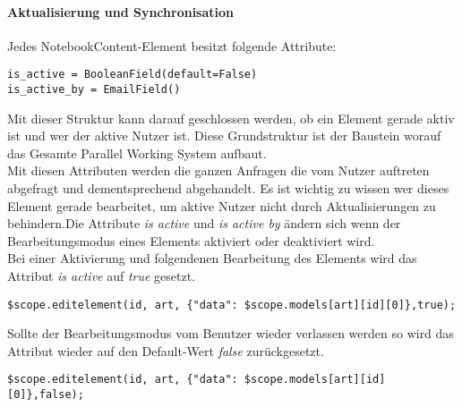 \paragraph{Aktualisierung und Synchronisation}
Jedes NotebookContent-Element besitzt folgende Attribute:
\begin{lstlisting}[caption={Parallel Working System Attribute}]
is_active = BooleanField(default=False)
is_active_by = EmailField()
\end{lstlisting}
Mit dieser Struktur kann darauf geschlossen werden, ob ein Element gerade aktiv ist und wer der aktive Nutzer ist. Diese Grundstruktur ist der Baustein worauf das Gesamte Parallel Working System aufbaut.\\
Mit diesen Attributen werden die ganzen Anfragen die vom Nutzer auftreten abgefragt und dementsprechend abgehandelt. Es ist wichtig zu wissen wer dieses Element gerade bearbeitet, um aktive Nutzer nicht durch Aktualisierungen zu behindern.Die Attribute \textit{is active} und \textit{is active by} ändern sich wenn der Bearbeitungsmodus eines Elements aktiviert oder deaktiviert wird.\\

Bei einer Aktivierung und folgendenen Bearbeitung des Elements wird das Attribut \textit{is active} auf \textit{true} gesetzt.
\begin{lstlisting}[caption={Bearbeitungsmodus true - PWS}]
$scope.editelement(id, art, {"data": $scope.models[art][id][0]},true);
\end{lstlisting}

Sollte der Bearbeitungsmodus vom Benutzer wieder verlassen werden so wird das Attribut wieder auf den Default-Wert \textit{false} zurückgesetzt.
\begin{lstlisting}[caption={Bearbeitungsmodus false - PWS}]
$scope.editelement(id, art, {"data": $scope.models[art][id][0]},false);
\end{lstlisting}

